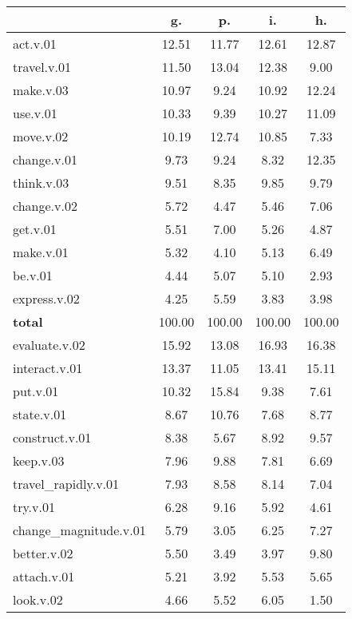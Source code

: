 \begin{table}[h!]
\begin{center}
\begin{tabular}{| l || c | c | c | c |}\hline
 & {\bf g.} & {\bf p.} & {\bf i.} & {\bf h.} \\\hline\hline
act.v.01 & 12.51  & 11.77  & 12.61  & 12.87 \\\hline
travel.v.01 & 11.50  & 13.04  & 12.38  & 9.00 \\\hline
make.v.03 & 10.97  & 9.24  & 10.92  & 12.24 \\\hline
use.v.01 & 10.33  & 9.39  & 10.27  & 11.09 \\\hline
move.v.02 & 10.19  & 12.74  & 10.85  & 7.33 \\\hline
change.v.01 & 9.73  & 9.24  & 8.32  & 12.35 \\\hline
think.v.03 & 9.51  & 8.35  & 9.85  & 9.79 \\\hline
change.v.02 & 5.72  & 4.47  & 5.46  & 7.06 \\\hline
get.v.01 & 5.51  & 7.00  & 5.26  & 4.87 \\\hline
make.v.01 & 5.32  & 4.10  & 5.13  & 6.49 \\\hline
be.v.01 & 4.44  & 5.07  & 5.10  & 2.93 \\\hline
express.v.02 & 4.25  & 5.59  & 3.83  & 3.98 \\\hline\hline
{{\bf total}} & 100.00  & 100.00  & 100.00  & 100.00 \\\hline\hline\hline
evaluate.v.02 & 15.92  & 13.08  & 16.93  & 16.38 \\\hline
interact.v.01 & 13.37  & 11.05  & 13.41  & 15.11 \\\hline
put.v.01 & 10.32  & 15.84  & 9.38  & 7.61 \\\hline
state.v.01 & 8.67  & 10.76  & 7.68  & 8.77 \\\hline
construct.v.01 & 8.38  & 5.67  & 8.92  & 9.57 \\\hline
keep.v.03 & 7.96  & 9.88  & 7.81  & 6.69 \\\hline
travel\_rapidly.v.01 & 7.93  & 8.58  & 8.14  & 7.04 \\\hline
try.v.01 & 6.28  & 9.16  & 5.92  & 4.61 \\\hline
change\_magnitude.v.01 & 5.79  & 3.05  & 6.25  & 7.27 \\\hline
better.v.02 & 5.50  & 3.49  & 3.97  & 9.80 \\\hline
attach.v.01 & 5.21  & 3.92  & 5.53  & 5.65 \\\hline
look.v.02 & 4.66  & 5.52  & 6.05  & 1.50 \\\hline\hline

\end{tabular}
\end{center}
\end{table}
